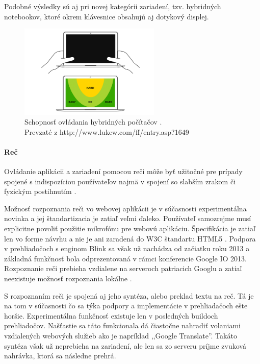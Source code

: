 Podobné výsledky \cite{mobilebooktouch} sú aj pri novej kategórii zariadení, tzv. hybridných notebookov, ktoré okrem klávesnice obsahujú aj dotykový displej.

\begin{figure}[H]
	\centering
	\includegraphics[width=0.6\textwidth]{img/tnav-touch-laptops.png}
	\caption[Schopnosť ovládania hybridných počítačov]{
		Schopnosť ovládania hybridných počítačov \cite{navigation}.\\
		Prevzaté z http://www.lukew.com/ff/entry.asp?1649}
	\label{fig: tnavlaptops}
\end{figure}



\paragraph{Reč} %

Ovládanie aplikácii a zariadení pomocou reči môže byť užitočné pre prípady spojené s indispozíciou používateľov najmä v spojení so slabším zrakom či fyzickým postihnutím \cite{SpeechRecognition}.

Možnosť rozpoznania reči vo webovej aplikácii je v súčasnosti experimentálna novinka a jej štandartizacia je zatiaľ veľmi ďaleko. Používateľ samozrejme musí explicitne povoliť použitie mikrofónu pre webovú aplikáciu. Špecifikácia je zatiaľ len vo forme návrhu a nie je ani zaradená do W3C štandartu HTML5 \cite{webspeechapi}. Podpora v prehliadočoch s enginom Blink sa však už nachádza od začiatku roku 2013 a základná funkčnosť bola odprezentovaná v rámci konferencie Google IO 2013. Rozpoznanie reči prebieha vzdialene na serveroch patriacich Googlu a zatiaľ neexistuje možnosť rozpoznania lokálne \cite{moreawesomeweb}.

S rozpoznaním reči je spojená aj jeho syntéza, alebo preklad textu na reč. Tá je na tom v súčasnosti čo sa týka podpory a implementácie v prehliadačoch ešte horšie. Experimentálna funkčnosť existuje len v posledných buildoch prehliadočov. Našťastie sa táto funkcionala dá čiastočne nahradiť volaniami vzdialených webových služieb ako je napríklad ,,Google Translate''. Takáto syntéza však už neprebieha na zariadení, ale len sa zo serveru príjme zvuková nahrávka, ktorá sa následne prehrá.

